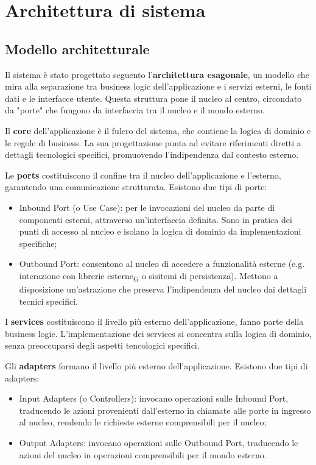 \section{Architettura di sistema }
\subsection{Modello architetturale}
Il sistema è stato progettato seguento l'\textbf{architettura esagonale}, un modello che mira alla separazione tra business logic dell'applicazione e i servizi esterni, le fonti dati e le interfacce utente. Questa struttura pone il nucleo al centro, circondato da "porte" che fungono da interfaccia tra il nucleo e il mondo esterno.

Il \textbf{core} dell'applicazione è il fulcro del sistema, che contiene la logica di dominio e le regole di business. La sua progettazione punta ad evitare riferimenti diretti a dettagli tecnologici specifici, promuovendo l'indipendenza dal contesto esterno.

Le \textbf{ports} costituiscono il confine tra il nucleo dell'applicazione e l'esterno, garantendo una comunicazione strutturata. Esistono due tipi di porte: 
\begin{itemize}
    \item Inbound Port (o Use Case): per le invocazioni del nucleo da parte di componenti esterni, attraverso un'interfaccia definita. Sono in pratica dei punti di accesso al nucleo e isolano la logica di dominio da implementazioni specifiche;
    \item Outbound Port: consentono al nucleo di accedere a funzionalità esterne (e.g. interazione con librerie esterne\textsubscript{G} o sisitemi di persistenza). Mettono a disposizione un'astrazione che preserva l'indipendenza del nucleo dai dettagli tecnici specifici. 
\end{itemize}

I \textbf{services} costituiscono il livello più esterno dell'applicazione, fanno parte della business logic. L'implementazione dei services si concentra sulla logica di dominio, senza preoccuparsi degli aspetti tencologici specifici.

Gli \textbf{adapters} formano il livello più esterno dell'applicazione. Esistono due tipi di adapters: 
\begin{itemize}
    \item Input Adapters (o Controllers): invocano operazioni sulle Inbound Port, traducendo le azioni provenienti dall'esterno in chiamate alle porte in ingresso al nucleo, rendendo le richieste esterne comprensibili per il nucleo;
    \item Output Adapters: invocano operazioni sulle Outbound Port, traducendo le azioni del nucleo in operazioni comprensibili per il mondo esterno.
\end{itemize}

